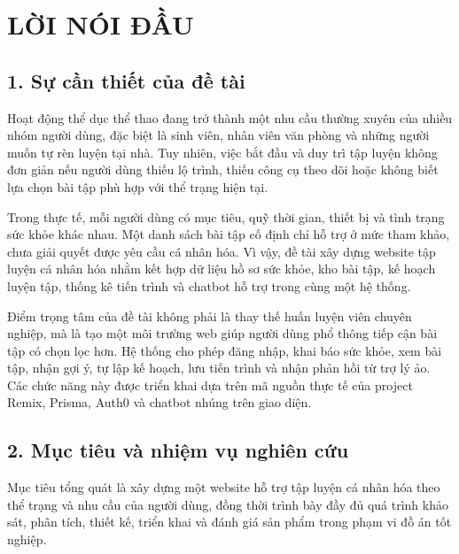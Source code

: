 \chapter*{LỜI NÓI ĐẦU}

\section*{1. Sự cần thiết của đề tài}

Hoạt động thể dục thể thao đang trở thành một nhu cầu thường xuyên của nhiều nhóm người dùng, đặc biệt là sinh viên, nhân viên văn phòng và những người muốn tự rèn luyện tại nhà. Tuy nhiên, việc bắt đầu và duy trì tập luyện không đơn giản nếu người dùng thiếu lộ trình, thiếu công cụ theo dõi hoặc không biết lựa chọn bài tập phù hợp với thể trạng hiện tại.


Trong thực tế, mỗi người dùng có mục tiêu, quỹ thời gian, thiết bị và tình trạng sức khỏe khác nhau. Một danh sách bài tập cố định chỉ hỗ trợ ở mức tham khảo, chưa giải quyết được yêu cầu cá nhân hóa. Vì vậy, đề tài xây dựng website tập luyện cá nhân hóa nhằm kết hợp dữ liệu hồ sơ sức khỏe, kho bài tập, kế hoạch luyện tập, thống kê tiến trình và chatbot hỗ trợ trong cùng một hệ thống.


Điểm trọng tâm của đề tài không phải là thay thế huấn luyện viên chuyên nghiệp, mà là tạo một môi trường web giúp người dùng phổ thông tiếp cận bài tập có chọn lọc hơn. Hệ thống cho phép đăng nhập, khai báo sức khỏe, xem bài tập, nhận gợi ý, tự lập kế hoạch, lưu tiến trình và nhận phản hồi từ trợ lý ảo. Các chức năng này được triển khai dựa trên mã nguồn thực tế của project Remix, Prisma, Auth0 và chatbot nhúng trên giao diện.


\section*{2. Mục tiêu và nhiệm vụ nghiên cứu}

Mục tiêu tổng quát là xây dựng một website hỗ trợ tập luyện cá nhân hóa theo thể trạng và nhu cầu của người dùng, đồng thời trình bày đầy đủ quá trình khảo sát, phân tích, thiết kế, triển khai và đánh giá sản phẩm trong phạm vi đồ án tốt nghiệp.


